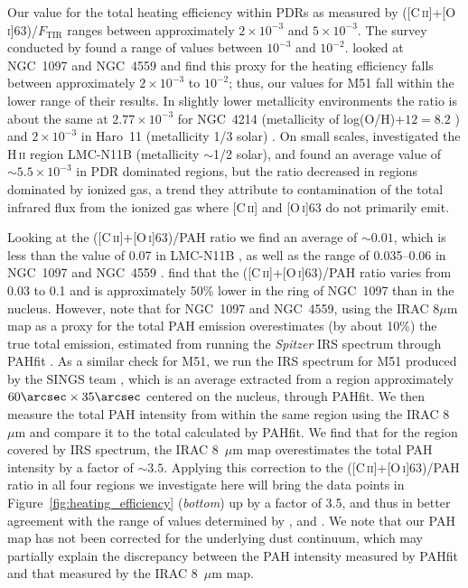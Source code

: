 \documentclass[preprint2]{aastex}
\begin{document}
Our value for the total heating efficiency within PDRs as measured by ([C\,\textsc{ii}]+[O\,\textsc{i}]63)/$F_{\mathrm{TIR}}$ ranges between approximately $2 \times 10^{-3}$ and $5 \times 10^{-3}$.  The survey conducted by \citet{2001ApJ...561..766M} found a range of values between $10^{-3}$ and $10^{-2}$.  \citet{2012ApJ...747...81C} looked at NGC~1097 and NGC~4559 and find this proxy for the heating efficiency falls between approximately $2 \times 10^{-3}$ to $10^{-2}$; thus, our values for M51 fall within the lower range of their results.  In slightly lower metallicity environments the ratio is about the same at $2.77 \times 10^{-3}$ for NGC~4214 (metallicity of log(O/H)$+ 12 = 8.2$ \citep{2010A&A...518L..57C}) and $2 \times 10^{-3}$ in Haro~11 (metallicity 1/3 solar) \citep{2012A&A...548A..20C}.  On small scales, \citet{2012A&A...548A..91L} investigated the H\,\textsc{ii} region LMC-N11B (metallicity $\sim$1/2 solar), and found an average value of $\sim 5.5 \times 10^{-3}$ in PDR dominated regions, but the ratio decreased in regions dominated by ionized gas, a trend they attribute to contamination of the total infrared flux from the ionized gas where [C\,\textsc{ii}] and [O\,\textsc{i}]63 do not primarily emit.

Looking at the ([C\,\textsc{ii}]+[O\,\textsc{i}]63)/PAH ratio we find an average of $\sim0.01$, which is less than the value of 0.07 in LMC-N11B \citep{2012A&A...548A..91L}, as well as the range of 0.035--0.06 in NGC~1097 and NGC~4559 \citep{2012ApJ...747...81C}.  \citet{2012ApJ...751..144B} find that the ([C\,\textsc{ii}]+[O\,\textsc{i}]63)/PAH ratio varies from 0.03 to 0.1 and is approximately 50\% lower in the ring of NGC~1097 than in the nucleus.  However, \citet{2012ApJ...747...81C} note that for NGC~1097 and NGC~4559, using the IRAC 8$\mu$m map as a proxy for the total PAH emission overestimates (by about 10\%) the true total emission, estimated from running the \emph{Spitzer} IRS spectrum through PAHfit \citep{2007ApJ...656..770S}.  As a similar check for M51, we run the IRS spectrum for M51 produced by the SINGS team \citep{2003PASP..115..928K}, which is an average extracted from a region approximately $60\arcsec \times 35\arcsec$ centered on the nucleus, through PAHfit.  We then measure the total PAH intensity from within the same region using the IRAC 8~$\mu$m and compare it to the total calculated by PAHfit.  We find that for the region covered by IRS spectrum, the IRAC 8~$\mu$m map overestimates the total PAH intensity by a factor of $\sim3.5$.  Applying this correction to the ([C\,\textsc{ii}]+[O\,\textsc{i}]63)/PAH ratio in all four regions we investigate here will bring the data points in Figure~\ref{fig:heating_efficiency} (\emph{bottom}) up by a factor of 3.5, and thus in better agreement with the range of values determined by \citep{2012A&A...548A..91L}, \citet{2012ApJ...751..144B} and \citep{2012ApJ...747...81C}.  We note that our PAH map has not been corrected for the underlying dust continuum, which may partially explain the discrepancy between the PAH intensity measured by PAHfit and that measured by the IRAC 8~$\mu$m map.
\end{document}
